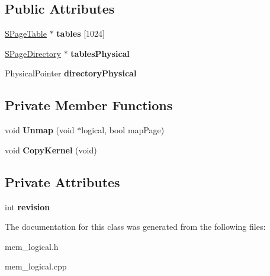 \subsection*{Public Attributes}
\begin{DoxyCompactItemize}
\item 
\mbox{\label{class_s_page_directory_info_ab1d1c6c36df2ace66d18a4f8a40788eb}} 
\hyperlink{struct_s_page_table}{S\+Page\+Table} $\ast$ {\bfseries tables} \mbox{[}1024\mbox{]}
\item 
\mbox{\label{class_s_page_directory_info_aff1bd278c8203d7e38de4daa46744641}} 
\hyperlink{struct_s_page_directory}{S\+Page\+Directory} $\ast$ {\bfseries tables\+Physical}
\item 
\mbox{\label{class_s_page_directory_info_ad8d2ba08bfa51fd90abbd91129122923}} 
Physical\+Pointer {\bfseries directory\+Physical}
\end{DoxyCompactItemize}
\subsection*{Private Member Functions}
\begin{DoxyCompactItemize}
\item 
\mbox{\label{class_s_page_directory_info_a37466e6a8aa1198603077a52f8b57c32}} 
void {\bfseries Unmap} (void $\ast$logical, bool map\+Page)
\item 
\mbox{\label{class_s_page_directory_info_af65fcf176fed527c726f2cccb9c929b1}} 
void {\bfseries Copy\+Kernel} (void)
\end{DoxyCompactItemize}
\subsection*{Private Attributes}
\begin{DoxyCompactItemize}
\item 
\mbox{\label{class_s_page_directory_info_a096d7b00f1f228b50cb0b7b3514f42f3}} 
int {\bfseries revision}
\end{DoxyCompactItemize}


The documentation for this class was generated from the following files\+:\begin{DoxyCompactItemize}
\item 
mem\+\_\+logical.\+h\item 
mem\+\_\+logical.\+cpp\end{DoxyCompactItemize}
